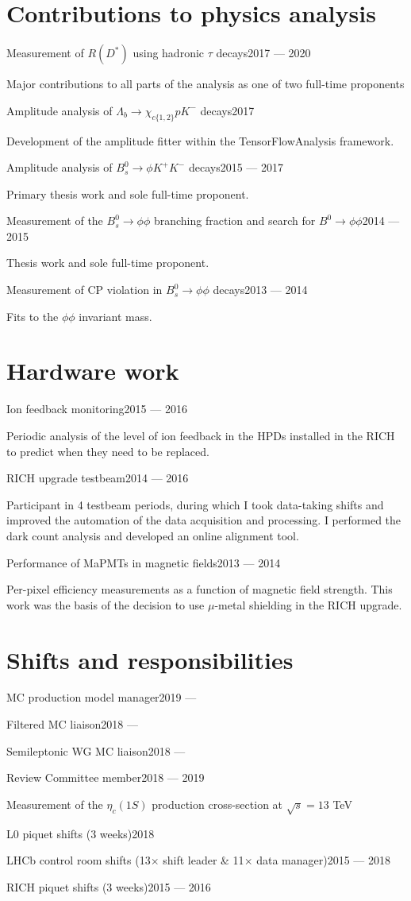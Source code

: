 \documentclass[contbibnum,titleabove]{simplecv}
\newcommand\dateditem[2]{\vspace{0.5em}#1\hfill#2\par}
\newcommand\topictitle[3]{\par\dateditem{#1}{#3}{\color{darkgray}#2}}
\begin{document}
	\section{Contributions to physics analysis}
	\topictitle{Measurement of $R(D^*)$ using hadronic $\tau$ decays}{Major contributions to all parts of the analysis as one of two full-time proponents}{2017 --- 2020}
	\topictitle{Amplitude analysis of $\Lambda_b \to \chi_{c\{1,2\}} p K^{-}$ decays}{Development of the amplitude fitter within the TensorFlowAnalysis framework.}{2017}
	\topictitle{Amplitude analysis of $B^0_s \to \phi K^{+}K^{-}$ decays}{Primary thesis work and sole full-time proponent.}{2015 --- 2017}
	\topictitle{Measurement of the $B^0_s \to \phi\phi$ branching fraction and search for $B^0 \to \phi \phi$}{Thesis work and sole full-time proponent.}{2014 --- 2015}
	\topictitle{Measurement of CP violation in $B^0_s \to \phi\phi$ decays}{Fits to the $\phi\phi$ invariant mass.}{2013 --- 2014}
	\section{Hardware work}
	\topictitle{Ion feedback monitoring}{
	Periodic analysis of the level of ion feedback in the HPDs installed in the RICH to predict when they need to be replaced.
	}{2015 --- 2016}
	\topictitle{RICH upgrade testbeam}{
	Participant in 4 testbeam periods, during which I took data-taking shifts and improved the automation of the data acquisition and processing. I performed the dark count analysis and developed an online alignment tool.
	}{2014 --- 2016}
	\topictitle{Performance of MaPMTs in magnetic fields}{
	Per-pixel efficiency measurements as a function of magnetic field strength. This work was the basis of the decision to use $\mu$-metal shielding in the RICH upgrade.
	}{2013 --- 2014}
	\section{Shifts and responsibilities}
	\topictitle{MC production model manager}{}{2019 --- \phantom{2020}}
	\topictitle{Filtered MC liaison}{}{2018 --- \phantom{2020}}
	\topictitle{Semileptonic WG MC liaison}{}{2018 --- \phantom{2020}}
	\topictitle{Review Committee member}{Measurement of the $\eta_c(1S)$ production cross-section at $\sqrt{s}=13$ TeV}{2018 --- 2019}
	\topictitle{L0 piquet shifts (3 weeks)}{}{2018}
	\topictitle{LHCb control room shifts (13$\times$ shift leader \& 11$\times$ data manager)}{}{2015 --- 2018}
	\topictitle{RICH piquet shifts (3 weeks)}{}{2015 --- 2016}
\end{document}
